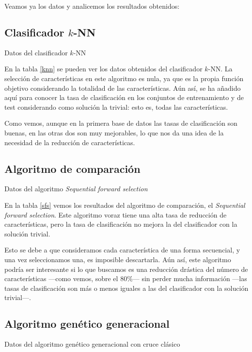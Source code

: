 \documentclass[a4paper, 11pt, titlepage]{article}
\begin{document}
    Veamos ya los datos y analicemos los resultados obtenidos:

    \subsection{Clasificador $k$-NN}
    \begin{table}[!htb]
        \maketable{\dataKNN}
        \caption{Datos del clasificador $k$-NN}
        \label{knn}
    \end{table}

    En la tabla \ref{knn} se pueden ver los datos obtenidos del clasificador $k$-NN. La selección de características en este algoritmo es nula, ya que es la propia función objetivo considerando la totalidad de las características. Aún así, se ha añadido aquí para conocer la tasa de clasificación en los conjuntos de entrenamiento y de test considerando como solución la trivial: esto es, todas las características.

    Como vemos, aunque en la primera base de datos las tasas de clasificación son buenas, en las otras dos son muy mejorables, lo que nos da una idea de la necesidad de la reducción de características.

    \subsection{Algoritmo de comparación}
    \begin{table}[!htb]
        \maketable{\dataSFS}
        \caption{Datos del algoritmo \emph{Sequential forward selection}}
        \label{sfs}
    \end{table}

    En la tabla \ref{sfs} vemos los resultados del algoritmo de comparación, el \emph{Sequential forward selection}. Este algoritmo voraz tiene una alta tasa de reducción de características, pero la tasa de clasificación no mejora la del clasificador con la solución trivial.

    Esto se debe a que consideramos cada característica de una forma secuencial, y una vez seleccionamos una, es imposible descartarla. Aún así, este algoritmo podría ser interesante si lo que buscamos es una reducción drástica del número de características ---como vemos, sobre el 80\%--- sin perder mucha información ---las tasas de clasificación son más o menos iguales a las del clasificador con la solución trivial---.

    \subsection{Algoritmo genético generacional}
    \begin{table}[!htb]
        \maketable{\dataAGG}
        \caption{Datos del algoritmo genético generacional con cruce clásico}
        \label{tablaAGG}
    \end{table}
\end{document}
